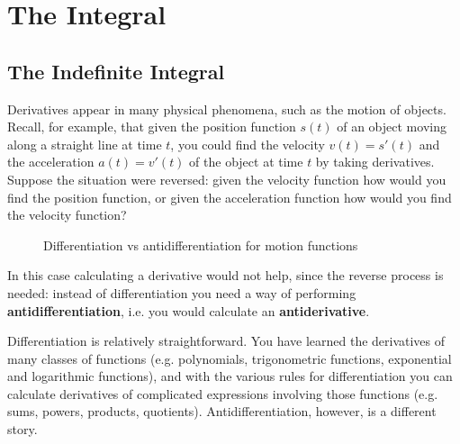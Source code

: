 \chapter{The Integral}\label{ch:integral}
\section{The Indefinite Integral}\label{sec:indefinite-integral}
Derivatives appear in many physical phenomena, such as the motion of objects.
Recall, for example, that given the position function $s(t)$ of an object moving
along a straight line at time $t$, you could find the velocity $v(t)=s'(t)$ and
the acceleration $a(t)=v'(t)$ of the object at time $t$ by taking derivatives.
Suppose the situation were reversed: given the velocity function how would you
find the position function, or given the acceleration function how would you
find the velocity function?

\begin{figure}[ht]
 \begin{center}
 \vspace{-5mm}
 \end{center}
 \caption[]{\quad Differentiation vs antidifferentiation for motion functions}
 \label{fig:antideriv}
\end{figure}

In this case calculating a derivative would not help, since the reverse
process is needed: instead of differentiation you need a way of performing
\textbf{antidifferentiation}, i.e. you would calculate an
\textbf{antiderivative}.


Differentiation is relatively straightforward. You have learned the
derivatives of many classes of functions (e.g. polynomials, trigonometric
functions, exponential and logarithmic functions), and with the various rules
for differentiation you can calculate derivatives of complicated expressions
involving those functions (e.g. sums, powers, products, quotients).
Antidifferentiation, however, is a different story.

